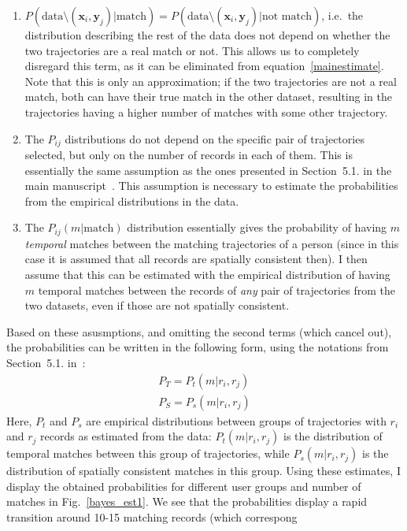 \documentclass[a4paper]{article}
\renewcommand{\vec}[1]{\mathbf{#1}}
\begin{document}
		\begin{enumerate}
			\item $P ( \textrm{data} \setminus (\vec{x}_i, \vec{y}_j) | \textrm{match} ) = P ( \textrm{data} \setminus (\vec{x}_i, \vec{y}_j) | %
				\textrm{not match} )$, i.e.~the distribution describing the rest of the data does not depend on whether the two trajectories are a real
				match or not. This allows us to completely disregard this term, as it can be eliminated from equation~\ref{mainestimate}. Note that
				this is only an approximation; if the two trajectories are not a real match, both can have their true match in the other dataset,
				resulting in the trajectories having a higher number of matches with some other trajectory.
			\item The $P_{ij}$ distributions do not depend on the specific pair of trajectories selected, but only on the number of records in each of
				them. This is essentially the same assumption as the ones presented in Section~5.1. in the main manuscript~\cite{matchingpaper}. This
				assumption is necessary to estimate the probabilities from the empirical distributions in the data.
			\item The $P_{ij} (m | \textrm{match} )$ distribution essentially gives the probability of having $m$ \emph{temporal} matches between the
				matching trajectories of a person (since in this case it is assumed that all records are spatially consistent then). I then assume that
				this can be estimated with the empirical distribution of having $m$ temporal matches between the records of \emph{any} pair of
				trajectories from the two datasets, even if those are not spatially consistent.
		\end{enumerate}
		Based on these asusmptions, and omitting the second terms (which cancel out), the probabilities can be written in the following form, using the
		notations from Section~5.1. in~\cite{matchingpaper}:
		\begin{gather}
			P_T = P_t(m|r_i,r_j) \\
			P_S = P_s(m|r_i,r_j)
		\end{gather}
		Here, $P_t$ and $P_s$ are empirical distributions between groups of trajectories with $r_i$ and $r_j$ records as estimated from the data:
		$P_t(m|r_i,r_j)$ is the distribution of temporal matches between this group of trajectories, while $P_s(m|r_i,r_j)$ is the distribution of
		spatially consistent matches in this group. Using these estimates, I display the obtained probabilities for different user groups and number
		of matches in Fig.~\ref{bayes_est1}. We see that the probabilities display a rapid transition around 10-15 matching records (which correspong
\end{document}
